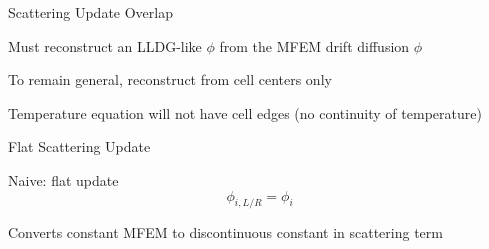 \documentclass[10pt]{beamer}
\begin{document}
\begin{frame}{Scattering Update Overlap}

	Must reconstruct an LLDG-like $\phi$ from the MFEM drift diffusion $\phi$ 

	\begin{figure}

		\def\svgwidth{\textwidth}
		

	\end{figure}

	To remain general, reconstruct from cell centers only 

	Temperature equation will not have cell edges (no continuity of temperature)

\end{frame}

\begin{frame}{Flat Scattering Update}

	Naive: flat update 
	\begin{equation*}
		\phi_{i,L/R} = \phi_i 
	\end{equation*}

	\begin{figure}

		\def\svgwidth{\textwidth}
		

	\end{figure}

	Converts constant MFEM to discontinuous constant in scattering term 

\end{frame}
\end{document}
